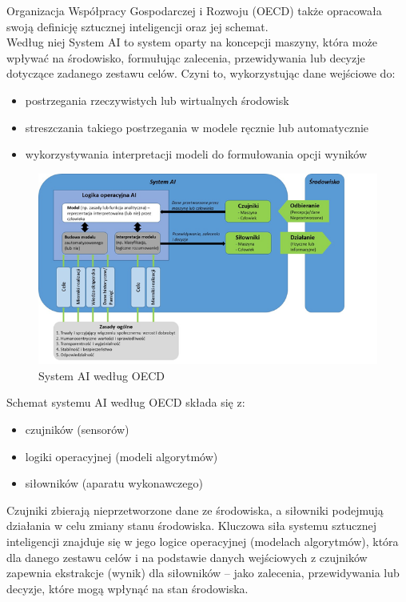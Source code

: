\documentclass{article}
\begin{document}
Organizacja Współpracy Gospodarczej i Rozwoju (OECD) także opracowała swoją definicję sztucznej inteligencji oraz jej schemat.\break
\\Według niej System AI to system oparty na koncepcji maszyny, która może wpływać na środowisko, formułując zalecenia, przewidywania lub decyzje dotyczące zadanego zestawu celów. Czyni to, wykorzystując dane wejściowe do:
\begin{itemize}
  \item postrzegania rzeczywistych lub wirtualnych środowisk
  \item streszczania takiego postrzegania w modele ręcznie lub automatycznie
  \item wykorzystywania interpretacji modeli do formułowania opcji wyników
\end{itemize}
\begin{figure}[h]
\caption{System AI według OECD}
\includegraphics[scale=0.7]{systemai}
\end{figure}
Schemat systemu AI według OECD składa się z:
\begin{itemize}
  \item czujników (sensorów)
  \item logiki operacyjnej (modeli algorytmów)
  \item siłowników (aparatu wykonawczego)
\end{itemize}
Czujniki zbierają nieprzetworzone dane ze środowiska, a siłowniki podejmują działania w celu zmiany stanu środowiska. Kluczowa siła systemu sztucznej inteligencji znajduje się w jego logice operacyjnej (modelach algorytmów), która dla danego zestawu celów i na podstawie danych wejściowych z czujników zapewnia ekstrakcje (wynik) dla siłowników – jako zalecenia, przewidywania lub decyzje, które mogą wpłynąć na stan środowiska.
\pagebreak
\end{document}
